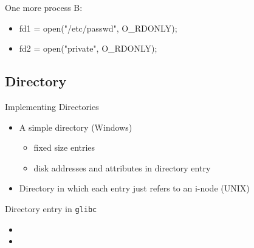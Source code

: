 \begin{frame}
  \begin{block}{One more process B:}\ttfamily
    \begin{itemize}
    \item[] fd1 = open("/etc/passwd", O\_RDONLY);
    \item[] fd2 = open("private", O\_RDONLY);
    \end{itemize}
  \end{block}
  \begin{center}
  \end{center}
\end{frame}

\subsection{Directory}
\label{sec:directory}

\begin{frame}{Implementing Directories}
  \begin{center}
  \end{center}
  \begin{itemize}
  \item[(a)] A simple directory (Windows)
    \begin{itemize}
    \item fixed size entries
    \item disk addresses and attributes in directory entry
    \end{itemize}
  \item[(b)] Directory in which each entry just refers to an i-node (UNIX)
  \end{itemize}
\end{frame}

\begin{frame}%
  \begin{block}{Directory entry in \texttt{glibc}}
  \end{block}
  \begin{itemize}
  \item[\$] 
  \item[\$] 
  \end{itemize}
\end{frame}

